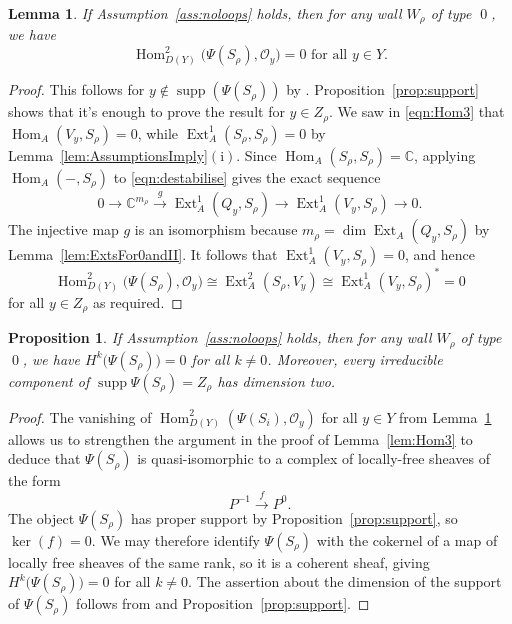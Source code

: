 \documentclass[11pt,reqno]{amsart}
\numberwithin{equation}{section}
\newtheorem{lemma}[theorem]{Lemma}
\newtheorem{proposition}[theorem]{Proposition}
\theoremstyle{definition}
\newcommand{\one}{\ensuremath{(\mathrm{i})}}
\newcommand{\Ext}{\operatorname{Ext}}
\newcommand{\Hom}{\operatorname{Hom}}
\newcommand{\0}{\operatorname{0}}
\newcommand{\supp}{\operatorname{supp}}
\begin{document}
 
 \begin{lemma}
 \label{lem:Hom2}
 If Assumption~\ref{ass:noloops} holds, then for any wall $W_\rho$ of type $\0$, we have  
 \[
\Hom_{D(Y)}^2\big(\Psi(S_\rho),\mathcal{O}_y\big) = 0 \text{ for all }y\in Y.
 \]
 \end{lemma}
 \begin{proof}
 This follows for $y\not\in \supp(\Psi(S_\rho))$ by \cite[Lemma~5.3]{BM02}. Proposition~\ref{prop:support} shows that it's enough to prove the result for $y\in Z_\rho$. We saw in \eqref{eqn:Hom3} that $\Hom_A(V_y,S_\rho)=0$, while $\Ext^1_A(S_\rho,S_\rho)=0$ by Lemma~\ref{lem:AssumptionsImply}\one. Since  $\Hom_A(S_\rho,S_\rho)=\mathbb{C}$, applying $\Hom_A(-,S_\rho)$ to \eqref{eqn:destabilise} gives the exact sequence 
\[
0\longrightarrow \mathbb{C}^{m_\rho}\stackrel{g}{\longrightarrow}\Ext_A^1(Q_y, S_\rho)\longrightarrow\Ext_A^1(V_y,S_\rho)\longrightarrow 0.
\]
The injective map $g$ is an isomorphism because $m_\rho=\dim \Ext_A(Q_y,S_\rho)$ by Lemma~\ref{lem:ExtsFor0andII}. It follows that $\Ext_A^1(V_y,S_\rho)=0$, and hence  
\[
\Hom_{D(Y)}^2\big(\Psi(S_\rho),\mathcal{O}_y\big) \cong \Ext^2_A(S_\rho, V_y) \cong\Ext_A^1(V_y,S_\rho)^* =0 
\]
for all $y\in Z_\rho$ as required. 
 \end{proof}
 
 
 \begin{proposition}
\label{prop:type0}
  If Assumption~\ref{ass:noloops} holds, then for any wall $W_\rho$ of type $\0$, we have $H^k\big(\Psi(S_\rho)\big)=0$ for all $k\neq 0$.
 Moreover, every irreducible component of $\supp\Psi(S_\rho) = Z_\rho$ has dimension two.
\end{proposition}  
\begin{proof} 
The vanishing of $\Hom_{D(Y)}^2(\Psi(S_i),\mathcal{O}_y)$ for all $y\in Y$ from Lemma~\ref{lem:Hom2} allows us to strengthen the argument in the proof of Lemma~\ref{lem:Hom3} to deduce that $\Psi(S_\rho)$ is quasi-isomorphic to a complex of locally-free sheaves of the form
 \[
 P^{-1}\stackrel{f}{\longrightarrow} P^{0}.
 \]
 The object $\Psi(S_\rho)$ has proper support by Proposition~\ref{prop:support}, so 
 $\ker(f)=0$. We may therefore identify $\Psi(S_\rho)$ with the cokernel of a map of locally free sheaves of the same rank, so it is a coherent sheaf, giving $H^k\big(\Psi(S_\rho)\big)=0$ for all $k\neq 0$. The assertion about the dimension of the support of $\Psi(S_\rho)$ follows from \cite[Corollary~5.5]{BM02} and Proposition~\ref{prop:support}.  
\end{proof}
\end{document}
